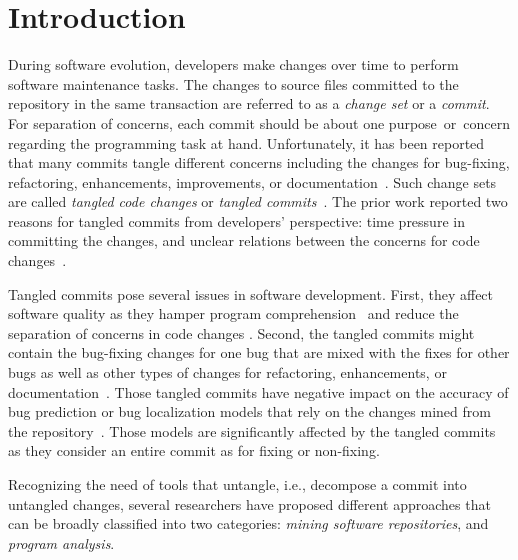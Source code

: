 \section{Introduction}
\label{intro:sec}

During software evolution, developers make changes over time
to perform software maintenance tasks.
The changes to source files committed to the repository in the same transaction are referred to as a {\em change set} or a {\em commit}.
For separation of concerns, each commit should be about one
purpose~or~concern regarding the programming task at hand.
Unfortunately, it has been reported that many commits tangle different  concerns including the changes for bug-fixing, refactoring,
enhancements, improvements, or
documentation~\cite{tao-fse12,kim-emse16,kim-msr13,hill-tse12,nguyen-issre13}.
Such change sets are called {\em tangled code changes} or {\em tangled
  commits}~\cite{kim-emse16,kim-msr13}. The prior work reported two
reasons for tangled commits from developers' perspective: time
pressure in committing the changes, and unclear relations between the
concerns for code changes~\cite{flexeme-fse20}.

Tangled commits pose several issues in software development. First,
they affect software quality as they hamper program
comprehension~\cite{tao-fse12} and reduce the separation of concerns
in code changes \cite{flexeme-fse20}. Second, the tangled commits
might contain the bug-fixing changes for one bug that are mixed with
the fixes for other bugs as well as other types of changes for
refactoring, enhancements, or
documentation~\cite{kim-emse16,kim-msr13,nguyen-issre13}. Those
tangled commits have negative impact on the accuracy of bug
prediction or bug localization models that rely on the changes mined from
the repository~\cite{kim-emse16,kim-msr13}.
Those models are significantly affected by the tangled commits as they consider an entire commit as for fixing or non-fixing.



Recognizing the need of tools that untangle, i.e., decompose a
commit into untangled changes, several researchers have proposed different approaches that can be broadly classified into two
categories: {\em mining software repositories}, and {\em program
  analysis}.

